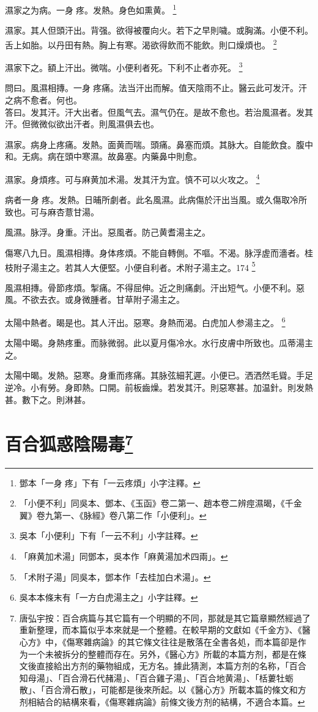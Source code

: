 濕家之为病。一身{\sungii 𥁞}疼。发熱。身色如熏黄。
	\footnote{
		鄧本「一身{\sungii 𥁞}疼」下有「一云疼煩」小字注釋。
	}

濕家。其人但頭汗出。背强。欲得被覆向火。若下之早則噦。{\khaai 或}胸滿。小便{\khaai 不}利。舌上如胎。以丹田有熱。胸上有寒。渴欲得飲而不能飲。則口燥煩也。
	\footnote{
		「小便不利」同吳本、鄧本、《玉函》卷二第一、趙本卷二辨痙濕暍，《千金翼》卷九第一、《脉經》卷八第二作「小便利」。
	}

濕家下之。額上汗出。微喘。小便利者死。下利不止者亦死。
	\footnote{
		吳本「小便利」下有「一云不利」小字註釋。
	}

問曰。風濕相摶。一身{\sungii 𥁞}疼痛。法当汗出而解。值天陰雨不止。醫云此可发汗。汗之病不愈者。何也。\\
答曰。发其汗。汗大出者。但風气去。濕气{\khaai 仍}在。是故不愈也。若治風濕者。发其汗。但微微似欲出汗者。則風濕俱去也。

濕家。病身上疼痛。发熱。面黄而喘。頭痛。鼻塞而煩。其脉大。自能飲食。腹中和。无病。病在頭中寒濕。故鼻塞。内藥鼻中則愈。

濕家。身煩疼。可与麻黄加术湯。发其汗为宜。慎不可以火攻之。
	\footnote{
		「麻黄加术湯」同鄧本，吳本作「麻黄湯加术四兩」。
	}

病者一身{\sungii 𥁞}疼。发熱。日晡所劇者。此名風濕。此病傷於汗出当風。或久傷取冷所致也。可与麻杏薏甘湯。


風濕。脉浮。身重。汗出。惡風者。防己黄耆湯主之。

傷寒八九日。風濕相摶。身体疼煩。不能自轉側。不嘔。不渴。脉浮虗而濇者。桂枝附子湯主之。若其人大便堅。小便自利者。术附子湯主之。174
	\footnote{
		「术附子湯」同吳本，鄧本作「去桂加白术湯」。
	}

風濕相摶。骨節疼煩。掣痛。不得屈伸。近之則痛劇。汗出短气。小便不利。惡風。不欲去衣。或身微腫者。甘草附子湯主之。

太陽中熱者。暍是也。其人汗出。惡寒。身熱而渴。白虎{\khaai 加人参}湯主之。
	\footnote{
		吳本本條末有「一方白虎湯主之」小字註釋。
	}

太陽中暍。身熱疼重。而脉微弱。此以夏月傷冷水。水行皮{\khaai 膚}中所致也。瓜蒂湯主之。

太陽中暍。发熱。惡寒。身重而疼痛。其脉弦細芤遲。小便已。洒洒然毛聳。手足逆冷。小有勞。身即熱。口開。前板齒燥。若发其汗。則惡寒甚。加温針。則发熱甚。數下之。則淋甚。

\chapter{百合狐惑陰陽毒\footnote{唐弘宇按：百合病篇与其它篇有一个明顯的不同，那就是其它篇章顯然經過了重新整理，而本篇似乎本來就是一个整體。在較早期的文獻如《千金方》、《醫心方》中，《傷寒雜病論》的其它條文往往是散落在全書各処，而本篇卻是作为一个未被拆分的整體而存在。另外，《醫心方》所載的本篇方剂，都是在條文後直接給出方剂的藥物組成，无方名。據此猜測，本篇方剂的名称，「百合知母湯」、「百合滑石代赭湯」、「百合雞子湯」、「百合地黄湯」、「栝蔞牡蛎散」、「百合滑石散」，可能都是後來所起。以《醫心方》所載本篇的條文和方剂相結合的結構來看，《傷寒雜病論》前條文後方剂的結構，不適合本篇。}}

